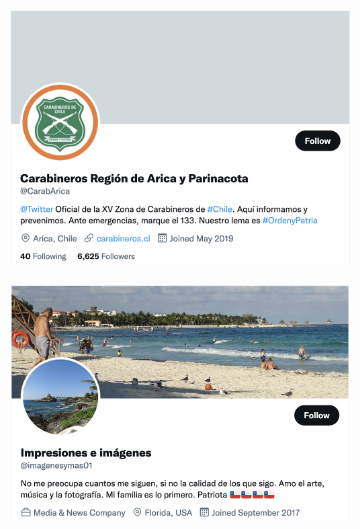 \begin{figure}[H]
        \hfill
            \begin{subfigure}{0.49\textwidth}
                \centering
                \includegraphics[width=.99\linewidth]{figs/chile_author_3.png}
            \end{subfigure}%
            \begin{subfigure}{0.49\textwidth}
                \centering
                \includegraphics[width=.99\linewidth]{figs/chile_author_4.png}
            \end{subfigure}
        \hfill
            \begin{subfigure}{0.49\textwidth}
                \centering

\end{subfigure}
\end{figure}
